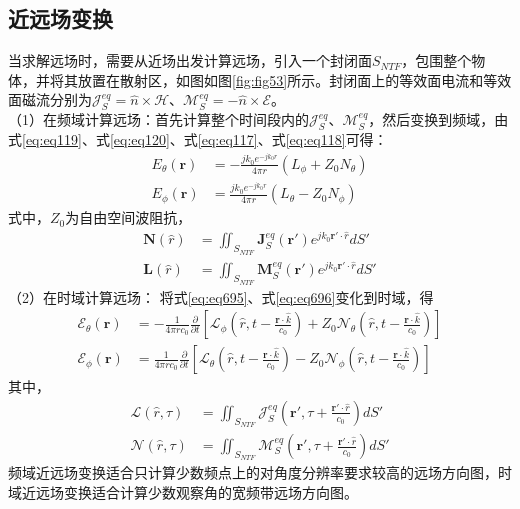 \documentclass{article}
\numberwithin{equation}{section}
\renewcommand{\vec}[1]{\boldsymbol{#1}}
\begin{document}
\subsection{近远场变换}
当求解远场时，需要从近场出发计算远场，引入一个封闭面$S_{NTF}$，包围整个物体，并将其放置在散射区，如图如图\ref{fig:fig53}所示。封闭面上的等效面电流和等效面磁流分别为$\vec{\mathcal{J}}_S^{eq}=\hat{n}\times\vec{\mathcal{H}}$、$\vec{\mathcal{M}}_S^{eq}=-\hat{n}\times\vec{\mathcal{E}}$。\\
（1）在频域计算远场：首先计算整个时间段内的$\vec{\mathcal{J}}_S^{eq}$、$\vec{\mathcal{M}}_S^{eq}$，然后变换到频域，由式\ref{eq:eq119}、式\ref{eq:eq120}、式\ref{eq:eq117}、式\ref{eq:eq118}可得：
\begin{align}
    \label{eq:eq695}
    E_{\theta}(\vec{r})&=-\frac{jk_0e^{-jk_0r}}{4\pi r}(L_{\phi}+Z_0N_{\theta}) \\
    \label{eq:eq696}
    E_{\phi}(\vec{r})&=\frac{jk_0e^{-jk_0r}}{4\pi r}(L_{\theta}-Z_0N_{\phi})
\end{align}
式中，$Z_0$为自由空间波阻抗，
\begin{align}
    \label{eq:eq697}
    \mathbf{N}(\hat{r})&=\iint_{S_{NTF}}\mathbf{J}_S^{eq}(\vec{r}')e^{jk_0\vec{r}'\cdot\hat{r}}dS' \\
    \mathbf{L}(\hat{r})&=\iint_{S_{NTF}}\mathbf{M}_S^{eq}(\vec{r}')e^{jk_0\vec{r}'\cdot\hat{r}}dS'
\end{align}
（2）在时域计算远场：
将式\ref{eq:eq695}、式\ref{eq:eq696}变化到时域，得
\begin{align}
    \label{eq:eq698}
    \mathcal{E}_{\theta}(\vec{r})&=-\frac{1}{4\pi rc_0}\frac{\partial}{\partial t}\left[\mathcal{L}_{\phi}\left(\hat{r},t-\frac{\vec{r}\cdot\hat{k}}{c_0}\right)+Z_0\mathcal{N}_{\theta}\left(\hat{r},t-\frac{\vec{r}\cdot\hat{k}}{c_0}\right)\right] \\
    \label{eq:eq699}
    \mathcal{E}_{\phi}(\vec{r})&=\frac{1}{4\pi rc_0}\frac{\partial}{\partial t}\left[\mathcal{L}_{\theta}\left(\hat{r},t-\frac{\vec{r}\cdot\hat{k}}{c_0}\right)-Z_0\mathcal{N}_{\phi}\left(\hat{r},t-\frac{\vec{r}\cdot\hat{k}}{c_0}\right)\right]
\end{align}
其中，
\begin{align}
    \vec{\mathcal{L}}(\hat{r},\tau)&=\iint_{S_{NTF}}\vec{\mathcal{J}}_S^{eq}\left(\vec{r}',\tau+\frac{\vec{r}'\cdot\hat{r}}{c_0}\right)dS' \\
    \vec{\mathcal{N}}(\hat{r},\tau)&=\iint_{S_{NTF}}\vec{\mathcal{M}}_S^{eq}\left(\vec{r}',\tau+\frac{\vec{r}'\cdot\hat{r}}{c_0}\right)dS'
\end{align}
频域近远场变换适合只计算少数频点上的对角度分辨率要求较高的远场方向图，时域近远场变换适合计算少数观察角的宽频带远场方向图。
\end{document}
